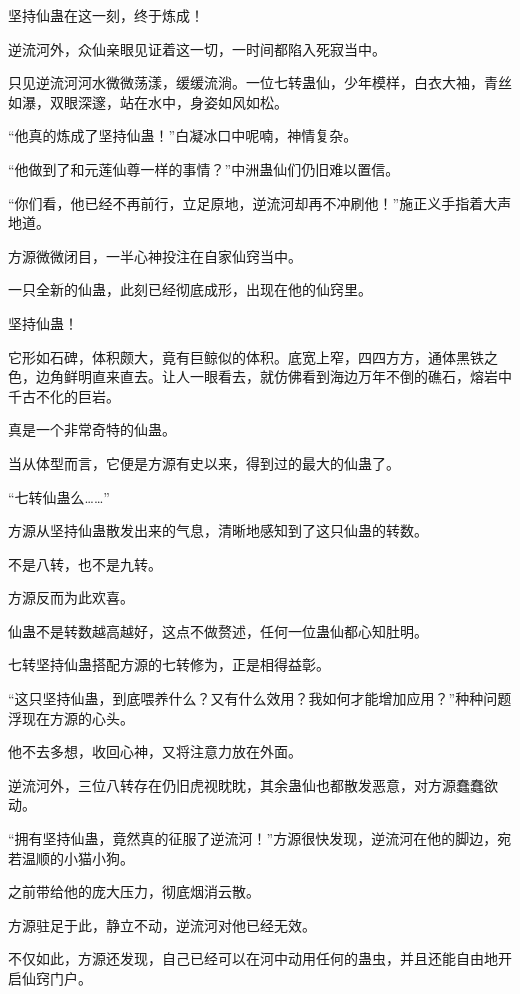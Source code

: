 
\begin{this_body}

坚持仙蛊在这一刻，终于炼成！

逆流河外，众仙亲眼见证着这一切，一时间都陷入死寂当中。

只见逆流河河水微微荡漾，缓缓流淌。一位七转蛊仙，少年模样，白衣大袖，青丝如瀑，双眼深邃，站在水中，身姿如风如松。

“他真的炼成了坚持仙蛊！”白凝冰口中呢喃，神情复杂。

“他做到了和元莲仙尊一样的事情？”中洲蛊仙们仍旧难以置信。

“你们看，他已经不再前行，立足原地，逆流河却再不冲刷他！”施正义手指着大声地道。

方源微微闭目，一半心神投注在自家仙窍当中。

一只全新的仙蛊，此刻已经彻底成形，出现在他的仙窍里。

坚持仙蛊！

它形如石碑，体积颇大，竟有巨鲸似的体积。底宽上窄，四四方方，通体黑铁之色，边角鲜明直来直去。让人一眼看去，就仿佛看到海边万年不倒的礁石，熔岩中千古不化的巨岩。

真是一个非常奇特的仙蛊。

当从体型而言，它便是方源有史以来，得到过的最大的仙蛊了。

“七转仙蛊么……”

方源从坚持仙蛊散发出来的气息，清晰地感知到了这只仙蛊的转数。

不是八转，也不是九转。

方源反而为此欢喜。

仙蛊不是转数越高越好，这点不做赘述，任何一位蛊仙都心知肚明。

七转坚持仙蛊搭配方源的七转修为，正是相得益彰。

“这只坚持仙蛊，到底喂养什么？又有什么效用？我如何才能增加应用？”种种问题浮现在方源的心头。

他不去多想，收回心神，又将注意力放在外面。

逆流河外，三位八转存在仍旧虎视眈眈，其余蛊仙也都散发恶意，对方源蠢蠢欲动。

“拥有坚持仙蛊，竟然真的征服了逆流河！”方源很快发现，逆流河在他的脚边，宛若温顺的小猫小狗。

之前带给他的庞大压力，彻底烟消云散。

方源驻足于此，静立不动，逆流河对他已经无效。

不仅如此，方源还发现，自己已经可以在河中动用任何的蛊虫，并且还能自由地开启仙窍门户。


\end{this_body}
